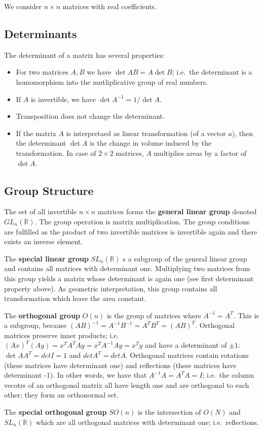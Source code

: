 
We consider \(n \times n\) matrices with real coefficients.

\subsection{Determinants}\label{determinants}

The determinant of a matrix has several properties:

\begin{itemize}
\item
  For two matrices \(A, B\) we have $\det AB = A \det B$; i.e.~the
  determinant is a homomorphism into the mutliplicative group of real
  numbers.
\item
  If \(A\) is invertible, we have \(\det A^{-1} = 1/ \det A\).
\item
  Transposition does not change the determinant.
\item
  If the matrix \(A\) is interpretaed as linear transformation (of a
  vector \(a\)), then the determinant \(\det A\) is the change in volume
  induced by the transformation. In case of \(2 \times 2\) matrices,
  \(A\) multiplies areas by a factor of \(\det A\).
\end{itemize}

\subsection{Group Structure}\label{group-structure}

The set of all invertible \(n \times n\) matrices forms the
\textbf{general linear group} denoted \(GL_n(\mathbb{R})\). The group
operation is matrix multiplication. The group conditions are fulfilled
as the product of two invertible matrices is invertible again and there
exists an inverse element.

The \textbf{special linear group} \(SL_n(\mathbb{R})\) s a subgroup of
the general linear group and contains all matrices with determinant one.
Multiplying two matrices from this group yields a matrix whose
determinant is again one (see first determinant property above). As
geometric interpretation, this group contains all transformation which
leave the area constant.

The \textbf{orthogonal group} \(O(n)\) is the group of matrices where
\(A^{-1} = A^T\). This is a subgroup, because
\((AB)^{-1} = A^{-1} B^{-1} = A^T B^T = (AB)^T\). Orthogonal matrices
preserve inner products; i.e.
\((Ax)^T (Ay) = x^T A^T A y = x^T A^{-1} A y = x^T y\) and have a
determinant of \(\pm 1\): \(\det A A^T = det I = 1\) and
\(det A^T = det A\). Orthogonal matrices contain rotations (these
matrices have determinant one) and reflections (these matrices have
determinant -1). In other words, we have that \(A^{-1}A = A^T A = I\);
i.e.~the column vecotrs of an orthogonal matrix all have length one and
are orthogonal to each other; they form an orthonormal set.

The \textbf{special orthogonal group} \(SO(n)\) is the intersection of
\(O(N)\) and \(SL_n(\mathbb{R})\) which are all orthogonal matrices with
determinant one; i.e.~reflections.
